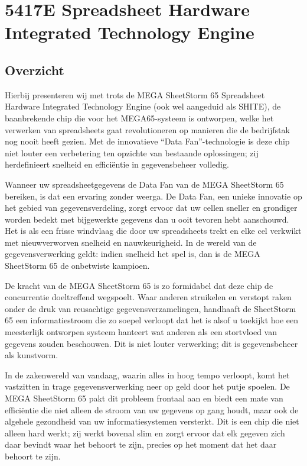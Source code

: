 \chapter{5417E Spreadsheet Hardware Integrated Technology Engine}
\label{cha:shite}

\section{Overzicht}

Hierbij presenteren wij met trots de MEGA SheetStorm 65 Spreadsheet Hardware Integrated Technology Engine (ook wel aangeduid als SHITE), de baanbrekende chip die voor het MEGA65-systeem is ontworpen, welke het verwerken van spreadsheets gaat revolutioneren op manieren die de bedrijfstak nog nooit heeft gezien. Met de innovatieve ``Data Fan''-technologie is deze chip niet louter een verbetering ten opzichte van bestaande oplossingen; zij herdefinieert snelheid en efficiëntie in gegevensbeheer volledig. 

Wanneer uw spreadsheetgegevens de Data Fan van de MEGA SheetStorm 65 bereiken, is dat een ervaring zonder weerga. De Data Fan, een unieke innovatie op het gebied van gegevensverdeling, zorgt ervoor dat uw cellen sneller en grondiger worden bedekt met bijgewerkte gegevens dan u ooit tevoren hebt aanschouwd. Het is als een frisse windvlaag die door uw spreadsheets trekt en elke cel verkwikt met nieuwverworven snelheid en nauwkeurigheid. In de wereld van de gegevensverwerking geldt: indien snelheid het spel is, dan is de MEGA SheetStorm 65 de onbetwiste kampioen. 

De kracht van de MEGA SheetStorm 65 is zo formidabel dat deze chip de concurrentie doeltreffend wegspoelt. Waar anderen struikelen en verstopt raken onder de druk van reusachtige gegevensverzamelingen, handhaaft de SheetStorm 65 een informatiestroom die zo soepel verloopt dat het is alsof u toekijkt hoe een meesterlijk ontworpen systeem hanteert wat anderen als een stortvloed van gegevens zouden beschouwen. Dit is niet louter verwerking; dit is gegevensbeheer als kunstvorm. 

In de zakenwereld van vandaag, waarin alles in hoog tempo verloopt, komt het vastzitten in trage gegevensverwerking neer op geld door het putje spoelen. De MEGA SheetStorm 65 pakt dit probleem frontaal aan en biedt een mate van efficiëntie die niet alleen de stroom van uw gegevens op gang houdt, maar ook de algehele gezondheid van uw informatiesystemen versterkt. Dit is een chip die niet alleen hard werkt; zij werkt bovenal slim en zorgt ervoor dat elk gegeven zich daar bevindt waar het behoort te zijn, precies op het moment dat het daar behoort te zijn. 

